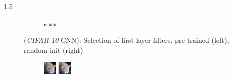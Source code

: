 \documentclass[final]{beamer}
\newlength{\onecolwid}
\newlength{\threecolwid}
\begin{document}
\begin{frame}[t]
\begin{columns}[t]
\begin{column}{\threecolwid}
\begin{alertblock}
\begin{columns}[t]
\begin{column}{1.5\onecolwid}
\begin{figure}
\begin{subfigure}{.4\linewidth}
					\includegraphics[width=0.1\linewidth]{graphics/cifar_filters/random_16.png} %
					\includegraphics[width=0.1\linewidth]{graphics/cifar_filters/random_17.png} %
					\includegraphics[width=0.1\linewidth]{graphics/cifar_filters/random_18.png}
				\end{subfigure}

			\caption{(\emph{CIFAR-10} CNN): Selection of first layer filters. pre-trained (left), random-init (right)}
			\label{fig:cifar_filters}

			\end{figure}

			\begin{figure}

				\begin{subfigure}{0.4\linewidth}

					\centering
					\includegraphics[width=0.4\linewidth]{graphics/reconstructions/cifar/relu/input_00_relu.png}
					\includegraphics[width=0.4\linewidth]{graphics/reconstructions/cifar/relu/reconstruction_00_relu.png}


\end{subfigure}
\end{figure}
\end{column}
\end{columns}
\end{alertblock}
\end{column}
\end{columns}
\end{frame}
\end{document}
